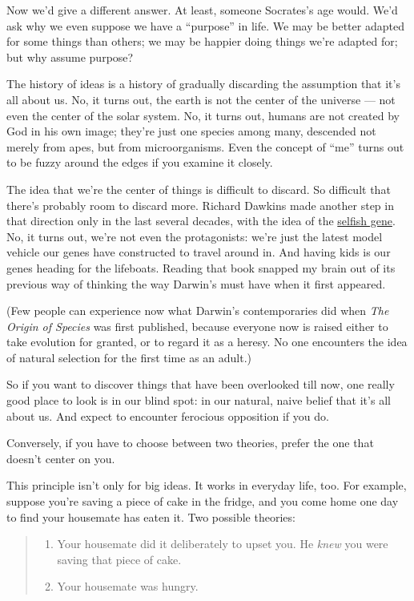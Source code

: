\documentclass[12pt]{book}
\begin{document}
Now we'd give a different answer. At least, someone Socrates's age
would. We'd ask why we even suppose we have a ``purpose'' in life. We
may be better adapted for some things than others; we may be happier
doing things we're adapted for; but why assume purpose?

The history of ideas is a history of gradually discarding the assumption
that it's all about us. No, it turns out, the earth is not the center of
the universe --- not even the center of the solar system. No, it turns
out, humans are not created by God in his own image; they're just one
species among many, descended not merely from apes, but from
microorganisms. Even the concept of ``me'' turns out to be fuzzy around
the edges if you examine it closely.

The idea that we're the center of things is difficult to discard. So
difficult that there's probably room to discard more. Richard Dawkins
made another step in that direction only in the last several decades,
with the idea of the
\href{http://en.wikipedia.org/wiki/The_Selfish_Gene}{selfish gene}. No,
it turns out, we're not even the protagonists: we're just the latest
model vehicle our genes have constructed to travel around in. And having
kids is our genes heading for the lifeboats. Reading that book snapped
my brain out of its previous way of thinking the way Darwin's must have
when it first appeared.

(Few people can experience now what Darwin's contemporaries did when
\emph{The Origin of Species} was first published, because everyone now
is raised either to take evolution for granted, or to regard it as a
heresy. No one encounters the idea of natural selection for the first
time as an adult.)

So if you want to discover things that have been overlooked till now,
one really good place to look is in our blind spot: in our natural,
naive belief that it's all about us. And expect to encounter ferocious
opposition if you do.

Conversely, if you have to choose between two theories, prefer the one
that doesn't center on you.

This principle isn't only for big ideas. It works in everyday life, too.
For example, suppose you're saving a piece of cake in the fridge, and
you come home one day to find your housemate has eaten it. Two possible
theories:

\begin{quote}
\begin{enumerate}
\def\labelenumi{\alph{enumi})}
\item
  Your housemate did it deliberately to upset you. He \emph{knew} you
  were saving that piece of cake.
\item
  Your housemate was hungry.
\end{enumerate}
\end{quote}
\end{document}
